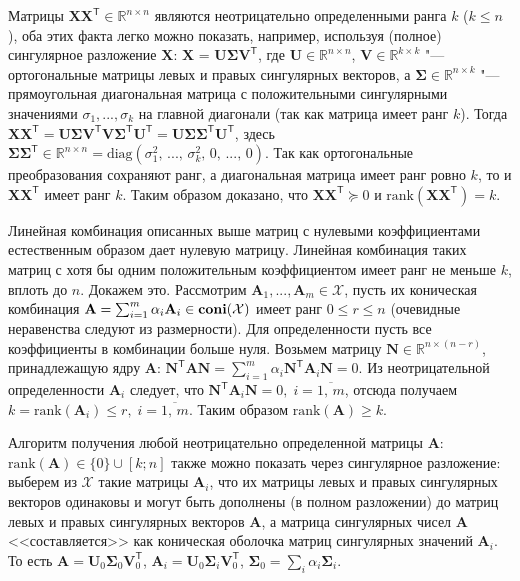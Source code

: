 \documentclass[a4paper,12pt]{article}
\begin{document}
\begin{enumerate}
		Матрицы $\mathbf{X} \mathbf{X}^\mathsf{T} \in \mathbb{R}^{n \times n}$ являются неотрицательно определенными ранга $k$ ($k\le n$), оба этих факта легко можно показать, например, используя (полное) сингулярное разложение $\mathbf{X}$: $\mathbf{X}$ = $\mathbf{U} \mathbf{\Sigma} \mathbf{V}^\mathsf{T}$, где $\mathbf{U} \in \mathbb{R}^{n\times n}$, $\mathbf{V} \in \mathbb{R}^{k\times k}$ "--- ортогональные матрицы левых и правых сингулярных векторов, а $\mathbf{\Sigma} \in \mathbb{R}^{n \times k}$ "--- прямоугольная диагональная матрица с положительными сингулярными значениями $\sigma_1,..., \sigma_k$ на главной диагонали (так как матрица имеет ранг $k$). 
		Тогда $\mathbf{X} \mathbf{X}^\mathsf{T} = \mathbf{U} \mathbf{\Sigma} \mathbf{V}^\mathsf{T} \mathbf{V} \mathbf{\Sigma}^\mathsf{T} \mathbf{U}^\mathsf{T} = \mathbf{U} \mathbf{\Sigma} \mathbf{\Sigma}^\mathsf{T} \mathbf{U}^\mathsf{T}$, здесь $\mathbf{\Sigma} \mathbf{\Sigma}^\mathsf{T} \in \mathbb{R}^{n\times n} = \text{diag}(\sigma_1^2,\,...,\, \sigma_k^2,\,0,\,...,\,0)$. Так как ортогональные преобразования сохраняют ранг, а диагональная матрица имеет ранг ровно $k$, то и $\mathbf{X} \mathbf{X}^\mathsf{T}$ имеет ранг $k$.  Таким образом доказано, что $\mathbf{X} \mathbf{X}^\mathsf{T} \succeq 0$ и $\text{rank}(\mathbf{X} \mathbf{X}^\mathsf{T})=k$.
		
		Линейная комбинация описанных выше матриц с нулевыми коэффициентами естественным образом дает нулевую матрицу. Линейная комбинация таких матриц с хотя бы одним положительным коэффициентом имеет ранг не меньше $k$, вплоть до $n$. Докажем это. Рассмотрим $\mathbf{A}_1,...,\mathbf{A}_m \in \mathcal{X}$, пусть их коническая комбинация $\mathbf{A} = \sum_{i=1}^{m} \alpha_i \mathbf{A}_i \in \text{\textbf{coni}}(\mathcal{X})$ имеет ранг $0 \leqslant r \leqslant n$ (очевидные неравенства следуют из размерности). Для определенности пусть все коэффициенты в комбинации больше нуля. Возьмем матрицу $\mathbf{N} \in \mathbb{R}^{n\times (n-r)}$, принадлежащую ядру $\mathbf{A}$: $\mathbf{N}^\mathsf{T} \mathbf{A} \mathbf{N} = \sum_{i=1}^{m} \alpha_i \mathbf{N}^\mathsf{T} \mathbf{A}_i \mathbf{N} = 0$. Из неотрицательной определенности $\mathbf{A}_i$ следует, что $\mathbf{N}^\mathsf{T} \mathbf{A}_i \mathbf{N} = 0,\; i=\overline{1,\,m}$, отсюда получаем $k=\text{rank}(\mathbf{A}_i) \leqslant r,\; i=\overline{1,\,m}$. Таким образом $\text{rank}(\mathbf{A}) \geqslant k$. 
		
		Алгоритм получения любой неотрицательно определенной матрицы $\mathbf{A}$: $\text{rank}(\mathbf{A})\in\{0\}\cup[k;n]$ также можно показать через сингулярное разложение: выберем из $\mathcal{X}$ такие матрицы $\mathbf{A}_i$, что их матрицы левых и правых сингулярных векторов одинаковы и могут быть дополнены (в полном разложении) до матриц левых и правых сингулярных векторов $\mathbf{A}$, а матрица сингулярных чисел $\mathbf{A}$ <<составляется>> как коническая оболочка матриц сингулярных значений $\mathbf{A}_i$. То есть $\mathbf{A} = \mathbf{U}_0 \mathbf{\Sigma}_0 \mathbf{V}_0^\mathsf{T}$, $\mathbf{A}_i = \mathbf{U}_0 \mathbf{\Sigma}_i \mathbf{V}_0^\mathsf{T}$, $\mathbf{\Sigma}_0 = \sum_{i} \alpha_i \mathbf{\Sigma}_i$.
		

\end{enumerate}
\end{document}
